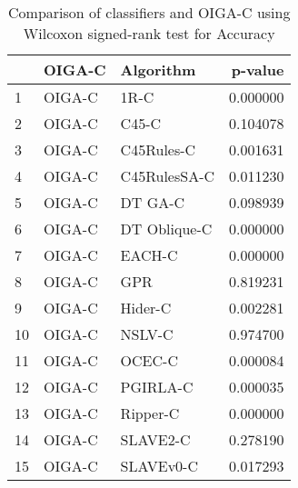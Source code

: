 \begin{table}
\footnotesize
\caption{Comparison of classifiers and OIGA-C using Wilcoxon signed-rank test for Accuracy}
\label{tab:OIGA-C wilcoxon Accuracy comparison}
\begin{tabular}{lllr}
\hline
 & OIGA-C & Algorithm & p-value \\
\hline
1 & OIGA-C & 1R-C & 0.000000 \\
2 & OIGA-C & C45-C & 0.104078 \\
3 & OIGA-C & C45Rules-C & 0.001631 \\
4 & OIGA-C & C45RulesSA-C & 0.011230 \\
5 & OIGA-C & DT GA-C & 0.098939 \\
6 & OIGA-C & DT Oblique-C & 0.000000 \\
7 & OIGA-C & EACH-C & 0.000000 \\
8 & OIGA-C & GPR & 0.819231 \\
9 & OIGA-C & Hider-C & 0.002281 \\
10 & OIGA-C & NSLV-C & 0.974700 \\
11 & OIGA-C & OCEC-C & 0.000084 \\
12 & OIGA-C & PGIRLA-C & 0.000035 \\
13 & OIGA-C & Ripper-C & 0.000000 \\
14 & OIGA-C & SLAVE2-C & 0.278190 \\
15 & OIGA-C & SLAVEv0-C & 0.017293 \\
\hline
\end{tabular}
\end{table}
